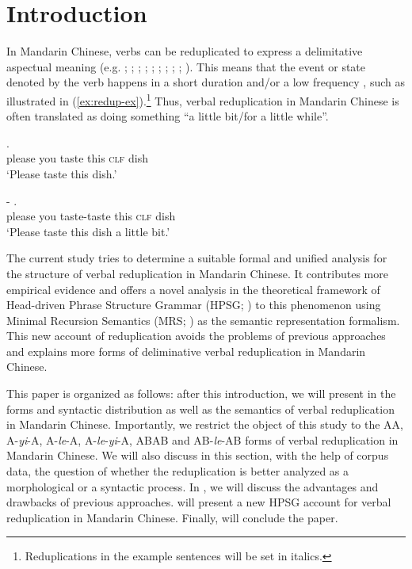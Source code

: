 \section{Introduction}\label{sec:intro}

In Mandarin Chinese, verbs can be reduplicated to express a delimitative aspectual meaning (e.g. \citealt[204--205]{Chao1968}; \citealt[232]{LiThompson1981};  \citealt[14]{Li1996}; \citealt[70]{Dai1997};  \citealt[382--383]{Zhu1998}; \citealt[420--421]{Xing2000}; \citealt[48]{Chen2001};  \citealt[288]{Tsao2001}; \citealt[11--12]{Yang2003}; \citealt[Sec.\,4.3]{XiaoMcEnery2004}). 
This means that the event or state denoted by the verb happens in a short duration and/or a low frequency \citep[155]{XiaoMcEnery2004}, such as illustrated in (\ref{ex:redup-ex}).\footnote{Reduplications
    in the example sentences will be set in italics.}
Thus, verbal reduplication in Mandarin Chinese is often translated as doing something ``a little bit/for a little while''.

\ea\label{ex:redup-ex} 
	\ea
	\gll {}     .\\
	please you taste this \textsc{clf} dish\\
	\glt `Please taste this dish.'
	
	\ex
	\gll {}  -   .\\
	please you taste-taste this \textsc{clf} dish\\
	\glt `Please taste this dish a little bit.' 
	\z
\z

The current study tries to determine a suitable formal and unified analysis for the structure of verbal reduplication in Mandarin Chinese.
It contributes more empirical evidence and 
offers a novel analysis in the theoretical framework of Head-driven Phrase Structure Grammar (HPSG; \citealt{PollardSag1994, Sag1997, HPSGHandbook-2}) to this phenomenon 
using Minimal Recursion Semantics (MRS; \citealt{Copestakeetal2005}) as the semantic representation formalism.
This new account of reduplication avoids the problems of previous approaches and
explains more forms of deliminative verbal reduplication in Mandarin Chinese.

This paper is organized as follows: 
after this introduction, we will present in  the forms and syntactic distribution as well as the semantics of verbal reduplication in Mandarin Chinese. 
Importantly, we restrict the object of this study to the AA, A-\textit{yi}-A, A-\textit{le}-A, A-\textit{le}-\textit{yi}-A, ABAB and AB-\textit{le}-AB forms of verbal reduplication in Mandarin Chinese.
We will also discuss in this section, with the help of corpus data, the question of whether the reduplication is better analyzed as a morphological or a syntactic process.
In , we will discuss the advantages and drawbacks of previous approaches. 
 will present a new {HPSG} account for verbal reduplication in Mandarin Chinese.
Finally,   will conclude the paper.

